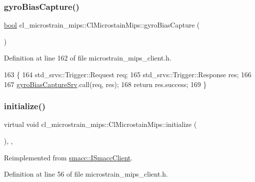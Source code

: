 \subsubsection{\texorpdfstring{gyro\+Bias\+Capture()}{gyroBiasCapture()}}
{\footnotesize\ttfamily \hyperlink{classbool}{bool} cl\+\_\+microstrain\+\_\+mips\+::\+Cl\+Microstain\+Mips\+::gyro\+Bias\+Capture (\begin{DoxyParamCaption}{ }\end{DoxyParamCaption})\hspace{0.3cm}{\ttfamily [inline]}}



Definition at line 162 of file microstrain\+\_\+mips\+\_\+client.\+h.


\begin{DoxyCode}
163     \{
164         std\_srvs::Trigger::Request req;
165         std\_srvs::Trigger::Response res;
166 
167         \hyperlink{classcl__microstrain__mips_1_1ClMicrostainMips_a584ea1089a89cd1039494d0fce19485c}{gyroBiasCaptureSrv}.call(req, res);
168         \textcolor{keywordflow}{return} res.success;
169     \}
\end{DoxyCode}
\mbox{\label{classcl__microstrain__mips_1_1ClMicrostainMips_ab52b739d8230f932ad3042fcd1b697f4}} 
\subsubsection{\texorpdfstring{initialize()}{initialize()}}
{\footnotesize\ttfamily virtual void cl\+\_\+microstrain\+\_\+mips\+::\+Cl\+Microstain\+Mips\+::initialize (\begin{DoxyParamCaption}{ }\end{DoxyParamCaption})\hspace{0.3cm}{\ttfamily [inline]}, {\ttfamily [override]}, {\ttfamily [virtual]}}



Reimplemented from \hyperlink{classsmacc_1_1ISmaccClient_a974ebb6ad6cf812e7b9de6b78b3d901f}{smacc\+::\+I\+Smacc\+Client}.



Definition at line 56 of file microstrain\+\_\+mips\+\_\+client.\+h.


